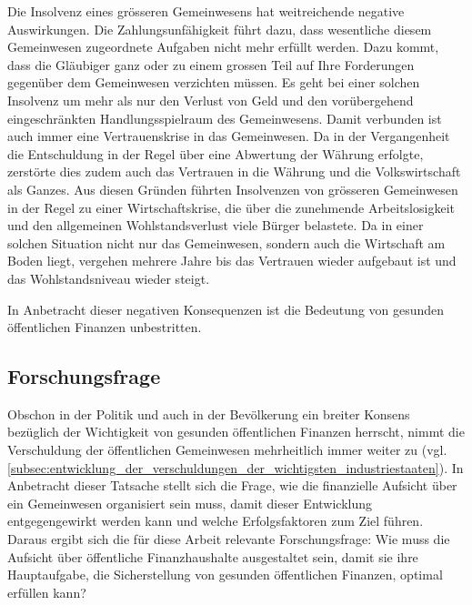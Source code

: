 \documentclass[10pt]{article}
\begin{document}
Die Insolvenz eines grösseren Gemeinwesens hat weitreichende negative Auswirkungen. Die Zahlungsunfähigkeit führt dazu, dass wesentliche diesem Gemeinwesen zugeordnete Aufgaben nicht mehr erfüllt werden. Dazu kommt, dass die Gläubiger ganz oder zu einem grossen Teil auf Ihre Forderungen gegenüber dem Gemeinwesen verzichten müssen. Es geht bei einer solchen Insolvenz um mehr als nur den Verlust von Geld und den vorübergehend eingeschränkten Handlungsspielraum des Gemeinwesens. Damit verbunden ist auch immer eine Vertrauenskrise in das Gemeinwesen. Da in der Vergangenheit die Entschuldung in der Regel über eine Abwertung der Währung erfolgte, zerstörte dies zudem auch das Vertrauen in die Währung und die Volkswirtschaft als Ganzes. Aus diesen Gründen führten Insolvenzen von grösseren Gemeinwesen in der Regel zu einer Wirtschaftskrise, die über die zunehmende Arbeitslosigkeit und den allgemeinen Wohlstandsverlust viele Bürger belastete. Da in einer solchen Situation nicht nur das Gemeinwesen, sondern auch die Wirtschaft am Boden liegt, vergehen mehrere Jahre bis das Vertrauen wieder aufgebaut ist und das Wohlstandsniveau wieder steigt.

In Anbetracht dieser negativen Konsequenzen ist die Bedeutung von gesunden öffentlichen Finanzen unbestritten.

\subsection{Forschungsfrage}\label{subsec:forschungsfrage}
Obschon in der Politik und auch in der Bevölkerung ein breiter Konsens bezüglich der Wichtigkeit von gesunden öffentlichen Finanzen herrscht, nimmt die Verschuldung der öffentlichen Gemeinwesen mehrheitlich immer weiter zu (vgl. \vref{subsec:entwicklung_der_verschuldungen_der_wichtigsten_industriestaaten}). In Anbetracht dieser Tatsache stellt sich die Frage, wie die finanzielle Aufsicht über ein Gemeinwesen organisiert sein muss, damit dieser Entwicklung entgegengewirkt werden kann und welche Erfolgsfaktoren zum Ziel führen. Daraus ergibt sich die für diese Arbeit relevante Forschungsfrage: Wie muss die Aufsicht über öffentliche Finanzhaushalte ausgestaltet sein, damit sie ihre Hauptaufgabe, die Sicherstellung von gesunden öffentlichen Finanzen, optimal erfüllen kann?
\end{document}
